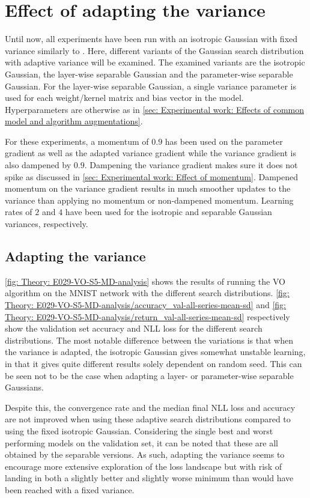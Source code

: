 
\section{Effect of adapting the variance}\label{sec: Experimental work: Effect of adapting the variance}
Until now, all experiments have been run with an isotropic Gaussian with fixed variance similarly to \cite{Salimans2017}. Here, different variants of the Gaussian search distribution with adaptive variance will be examined.
The examined variants are the isotropic Gaussian, the layer-wise separable Gaussian and the parameter-wise separable Gaussian. For the layer-wise separable Gaussian, a single variance parameter is used for each weight/kernel matrix and bias vector in the model.
Hyperparameters are otherwise as in \autoref{sec: Experimental work: Effects of common model and algorithm augmentations}.

For these experiments, a momentum of $0.9$ has been used on the parameter gradient as well as the adapted variance gradient while the variance gradient is also dampened by $0.9$. Dampening the variance gradient makes sure it does not spike as discussed in \autoref{sec: Experimental work: Effect of momentum}. Dampened momentum on the variance gradient results in much smoother updates to the variance than applying no momentum or non-dampened momentum. Learning rates of $2$ and $4$ have been used for the isotropic and separable Gaussian variances, respectively.


\subsection{Adapting the variance}
\autoref{fig: Theory: E029-VO-S5-MD-analysis} shows the results of running the \gls{VO} algorithm on the MNIST network with the different search distributions. 
\autoref{fig: Theory: E029-VO-S5-MD-analysis/accuracy_val-all-series-mean-sd} and \ref{fig: Theory: E029-VO-S5-MD-analysis/return_val-all-series-mean-sd} respectively show the validation set accuracy and \gls{NLL} loss for the different search distributions.
The most notable difference between the variations is that when the variance is adapted, the isotropic Gaussian gives somewhat unstable learning, in that it gives quite different results solely dependent on random seed.
This can be seen not to be the case when adapting a layer- or parameter-wise separable Gaussians. 

Despite this, the convergence rate and the median final \gls{NLL} loss and accuracy are not improved when using these adaptive search distributions compared to using the fixed isotropic Gaussian. 
Considering the single best and worst performing models on the validation set, it can be noted that these are all obtained by the separable versions. As such, adapting the variance seems to encourage more extensive exploration of the loss landscape but with risk of landing in both a slightly better and slightly worse minimum than would have been reached with a fixed variance.

